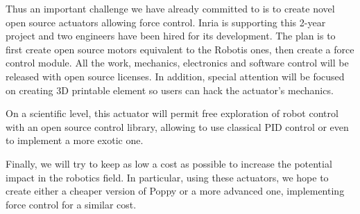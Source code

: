 Thus an important challenge we have already committed to is to create novel open source actuators allowing force control. Inria is supporting this 2-year project and two engineers have been hired for its development. The plan is to first create open source motors equivalent to the Robotis ones, then create a force control module. All the work, mechanics, electronics and software control will be released with open source licenses. In addition, special attention will be focused on creating 3D printable element so users can hack the actuator’s mechanics.

On a scientific level, this actuator will permit free exploration of robot control with an open source control library, allowing to use classical PID control or even to implement a more exotic one.

Finally, we will try to keep as low a cost as possible to increase the potential impact in the robotics field. In particular, using these actuators, we hope to create either a cheaper version of Poppy or a more advanced one, implementing force control for a similar cost.



